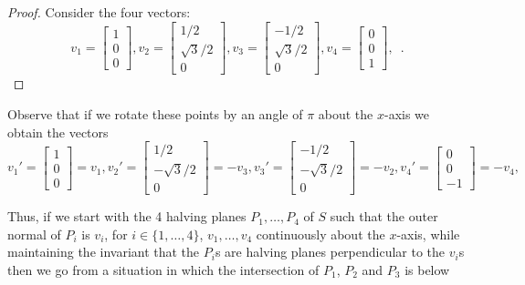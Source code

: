 \documentclass[lotsofwhite]{patmorin}
\begin{document}
\begin{proof}
Consider the four vectors: 
\[
   v_1=\left[\begin{array}{c} 1 \\ 0 \\ 0 \end{array}\right] ,
   v_2=\left[\begin{array}{c} 1/2 \\ \sqrt{3}/2 \\ 0 \end{array}\right] ,
   v_3=\left[\begin{array}{c} -1/2 \\ \sqrt{3}/2 \\ 0 \end{array}\right] ,
   v_4=\left[\begin{array}{c} 0 \\ 0 \\ 1 \end{array}\right] ,
  \enspace .
\]
\end{proof}
Observe that if we rotate these points by an angle of $\pi$ about the
$x$-axis we obtain the vectors 
\[
   v_1'=\left[\begin{array}{c} 1 \\ 0 \\ 0 \end{array}\right]=v_1 ,
   v_2'=\left[\begin{array}{c} 1/2 \\ -\sqrt{3}/2 \\ 0 \end{array}\right]=-v_3 ,
   v_3'=\left[\begin{array}{c} -1/2 \\ -\sqrt{3}/2 \\ 0 \end{array}\right] =-v_2,
   v_4'=\left[\begin{array}{c} 0 \\ 0 \\ -1 \end{array}\right] = -v_4 ,
\]

Thus, if we start with the 4 halving planes $P_1,\ldots,P_4$ of $S$
such that the outer normal of $P_i$ is $v_i$, for
$i\in\{1,\ldots,4\}$, $v_1,\ldots,v_4$ continuously about the
$x$-axis, while maintaining the invariant that the $P_i$s are halving
planes perpendicular to the $v_i$s then we go from a situation in
which the intersection of $P_1$, $P_2$ and $P_3$ is below 
\end{document}
